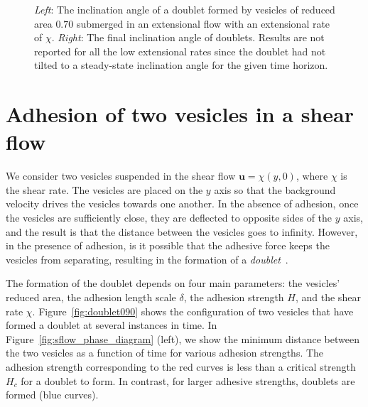 \documentclass[prf,superscriptaddress,showpacs]{revtex4-1}
\newcommand{\uu}{\mathbf{u}}
\begin{document}
\begin{figure}[htp]
\begin{minipage}{0.45\textwidth}
  \end{minipage}
  \caption{\label{fig:extensionalInclinationAngle} {\em Left}: The
  inclination angle of a doublet formed by vesicles of reduced area
  $0.70$ submerged in an extensional flow with an extensional rate of
  $\chi$.  {\em Right}: The final inclination angle of doublets.
  Results are not reported for all the low extensional rates since the
  doublet had not tilted to a steady-state inclination angle for the
  given time horizon.}
\end{figure}


\section{Adhesion of two vesicles in a shear flow}
\label{sec:sflow} 
We consider two vesicles suspended in the shear flow $\uu = \chi(y,0)$,
where $\chi$ is the shear rate.  The vesicles are placed on the $y$ axis
so that the background velocity drives the vesicles towards one another.
In the absence of adhesion, once the vesicles are sufficiently close,
they are deflected to opposite sides of the $y$ axis, and the result is
that the distance between the vesicles goes to infinity.  However, in
the presence of adhesion, is it possible that the adhesive force keeps
the vesicles from separating, resulting in the formation of a {\em
doublet}~\cite{}.

The formation of the doublet depends on four main parameters: the
vesicles' reduced area, the adhesion length scale $\delta$, the adhesion
strength $H$, and the shear rate $\chi$.  Figure~\ref{fig:doublet090}
shows the configuration of two vesicles that have formed a doublet at
several instances in time.  In Figure~\ref{fig:sflow_phase_diagram}
(left), we show the minimum distance between the two vesicles as a
function of time for various adhesion strengths.  The adhesion strength
corresponding to the red curves is less than a critical strength $H_c$
for a doublet to form.  In contrast, for larger adhesive strengths,
doublets are formed (blue curves).
\end{document}
